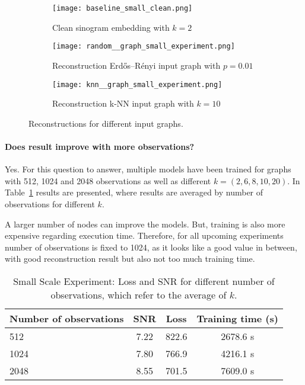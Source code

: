 \begin{figure}[H]
  \captionsetup[subfigure]{justification=centering}
  \centering
  \begin{subfigure}[t]{0.3\textwidth}
      \texttt{[image: baseline\_small\_clean.png]}
      \caption{Clean sinogram embedding with $k=2$}
      \label{fig:small_experiment_clean2}
  \end{subfigure}\hfill
  \begin{subfigure}[t]{0.3\textwidth}
    \texttt{[image: random\_\_graph\_small\_experiment.png]}
    \caption{Reconstruction Erdős–Rényi input graph with $p=0.01$}
    \label{fig:small_experiment_random_graph}
  \end{subfigure}\hfill
  \begin{subfigure}[t]{0.3\textwidth}
    \texttt{[image: knn\_\_graph\_small\_experiment.png]}
    \caption{Reconstruction k-NN input graph with $k=10$}
    \label{fig:small_experiment_knn_graph}
  \end{subfigure}
  \caption{Reconstructions for different input graphs.}
  \label{fig:input_graph_small}
\end{figure}



  \paragraph{Does result improve with more observations?}
  Yes.
  For this question to answer, multiple models have been trained for graphs with 512, 1024 and 2048 observations
  as well as different $k = (2,6,8,10,20)$.
  In Table~\ref{tab:graph_knn} results are presented, where results are averaged by number of observations 
  for different $k$.

  A larger number of nodes can improve the models. 
  But, training is also more expensive regarding execution time. 
  Therefore, for all upcoming experiments number of observations is fixed to 1024, as it looks like a good
  value in between, with good reconstruction result but also not too much training time.
  
  \begin{table}[H]
    \centering
      \begin{tabular}{l|ccc}
      \toprule
      \small \textbf{Number of observations} & \small \small \textbf{SNR} & \small \textbf{Loss} & \textbf{Training time (s)}  \\ 
      \midrule
      512  &  7.22    &  822.6  & 2678.6 s \\ \hline
      1024 &  7.80    &  766.9 & 4216.1 s \\ \hline
      2048 &  8.55    &  701.5 & 7609.0 s  \\ \hline
      \midrule
      \end{tabular}
    \caption{Small Scale Experiment: Loss and SNR for different number of observations, which refer to the average of 
    $k$.}
    \label{tab:graph_knn}
  \end{table}


